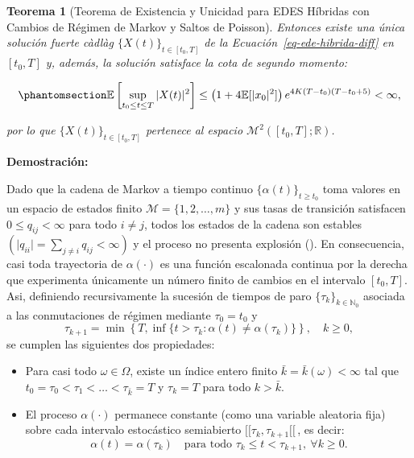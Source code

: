 \documentclass[
  spanish,
  us-letterpaper,
]{scrreprt}
\providecommand{\tightlist}{%
  \setlength{\itemsep}{0pt}\setlength{\parskip}{0pt}}
\numberwithin{equation}{section}
\theoremstyle{plain}
\newtheorem{theorem}{Teorema}[chapter]
\theoremstyle{plain}
\theoremstyle{definition}
\theoremstyle{plain}
\theoremstyle{remark}
\begin{document}
\begin{theorem}[Teorema de Existencia y Unicidad para EDES Híbridas con
Cambios de Régimen de Markov y Saltos de
Poisson]
Entonces existe una única solución fuerte càdlàg
\(\{X(t)\}_{t \in [t_0, T]}\) de la Ecuación~\ref{eq-ede-hibrida-diff}
en \([t_0, T]\) y, además, la solución satisface la cota de segundo
momento:

\begin{equation}\phantomsection\label{eq-cota-supremo-hibrida}{
\mathbb{E}\left[ \sup_{t_0 \le t \le T} \vert X(t) \vert^2 \right] \le \left( 1 + 4\mathbb{E}[\vert x_0 \vert^2] \right) e^{4K(T - t_0)(T - t_0 + 5)} < \infty,
}\end{equation}

por lo que \(\{X(t)\}_{t \in [t_0, T]}\) pertenece al espacio
\(\mathcal{M}^2([t_0, T]; \mathbb{R})\).

\end{theorem}

\textbf{Demostración:}

Dado que la cadena de Markov a tiempo continuo
\(\{\alpha(t)\}_{t \ge t_0}\) toma valores en un espacio de estados
finito \(\mathcal{M} = \{1, 2, \dots, m\}\) y sus tasas de transición
satisfacen \(0 \le q_{ij} < \infty\) para todo \(i \neq j\), todos los
estados de la cadena son estables
\(\left( \displaystyle \vert q_{ii} \vert = \sum_{j \neq i} q_{ij} < \infty \right)\)
y el proceso no presenta explosión (). En consecuencia, casi toda trayectoria de
\(\alpha(\cdot)\) es una función escalonada continua por la derecha que
experimenta únicamente un número finito de cambios en el intervalo
\([t_0, T]\). Asi, definiendo recursivamente la sucesión de tiempos de
paro \(\{\tau_k\}_{k \in \mathbb{N}_0}\) asociada a las conmutaciones de
régimen mediante \(\tau_0 = t_0\) y \[
\tau_{k+1} = \min\left\{T, \inf\{t > \tau_k : \alpha(t) \neq \alpha(\tau_k)\}\right\}, \quad k \ge 0,
\] se cumplen las siguientes dos propiedades:

\begin{itemize}
\tightlist
\item
  Para casi todo \(\omega \in \Omega\), existe un índice entero finito
  \(\bar{k} = \bar{k}(\omega) < \infty\) tal que
  \(t_0 = \tau_0 < \tau_1 < \dots < \tau_{\bar{k}} = T\) y
  \(\tau_k = T\) para todo \(k > \bar{k}\).
\item
  El proceso \(\alpha(\cdot)\) permanece constante (como una variable
  aleatoria fija) sobre cada intervalo estocástico semiabierto
  \([[\tau_k, \tau_{k+1}[[\,\), es decir: \[
  \alpha(t) = \alpha(\tau_k) \quad \text{para todo } \tau_k \le t < \tau_{k+1}, \ \forall k \ge 0.
  \]
\end{itemize}
\end{document}
